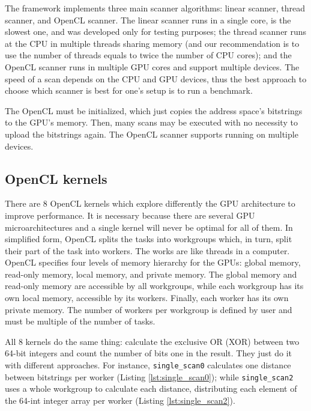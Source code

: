 The framework implements three main scanner algorithms: linear scanner, thread scanner, and OpenCL scanner. The linear scanner runs in a single core, is the slowest one, and was developed only for testing purposes; the thread scanner runs at the CPU in multiple threads sharing memory (and our recommendation is to use the number of threads equals to twice the number of CPU cores); and the OpenCL scanner runs in multiple GPU cores and support multiple devices. The speed of a scan depends on the CPU and GPU devices, thus the best approach to choose which scanner is best for one's setup is to run a benchmark.

The OpenCL must be initialized, which just copies the address space's bitstrings to the GPU's memory. Then, many scans may be executed with no necessity to upload the bitstrings again. The OpenCL scanner supports running on multiple devices.

\subsection{OpenCL kernels}

There are 8 OpenCL kernels which explore differently the GPU architecture to improve performance. It is necessary because there are several GPU microarchitectures and a single kernel will never be optimal for all of them. In simplified form, OpenCL splits the tasks into workgroups which, in turn, split their part of the task into workers. The works are like threads in a computer. OpenCL specifies four levels of memory hierarchy for the GPUs: global memory, read-only memory, local memory, and private memory. The global memory and read-only memory are accessible by all workgroups, while each workgroup has its own local memory, accessible by its workers. Finally, each worker has its own private memory. The number of workers per workgroup is defined by user and must be multiple of the number of tasks.

All 8 kernels do the same thing: calculate the exclusive OR (XOR) between two 64-bit integers and count the number of bits one in the result. They just do it with different approaches. For instance, \lstinline{single_scan0} calculates one distance between bitstrings per worker (Listing \ref{lst:single_scan0}); while \lstinline{single_scan2} uses a whole workgroup to calculate each distance, distributing each element of the 64-int integer array per worker (Listing \ref{lst:single_scan2}).

